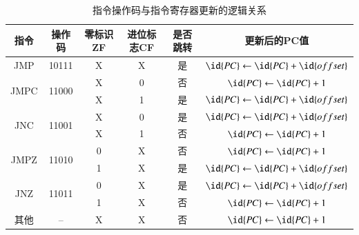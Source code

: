 \documentclass[titlepage, 11pt]{article}
\begin{document}
		\begin{table}[htb]
			\centering
			\caption{指令操作码与指令寄存器更新的逻辑关系}
			\begin{tabular}{c|c|c|c|c|c}
				指令                    & 操作码                    & 零标识ZF & 进位标志CF & 是否跳转 & 更新后的PC值                            \\ \hline
				JMP                   & 10111                  & X     & X      & 是    & $\id{PC}\gets \id{PC}+\id{offset}$ \\ \hline
				\multirow{2}{*}{JMPC} & \multirow{2}{*}{11000} & X     & 0      & 否    & $\id{PC}\gets \id{PC}+1$           \\ \cline{3-6} 
				&                        & X     & 1      & 是    & $\id{PC}\gets \id{PC}+\id{offset}$ \\ \hline
				\multirow{2}{*}{JNC}  & \multirow{2}{*}{11001} & X     & 0      & 是    & $\id{PC}\gets \id{PC}+\id{offset}$ \\ \cline{3-6} 
				&                        & X     & 1      & 否    & $\id{PC}\gets \id{PC}+1$           \\ \hline
				\multirow{2}{*}{JMPZ} & \multirow{2}{*}{11010} & 0     & X      & 否    & $\id{PC}\gets \id{PC}+1$           \\ \cline{3-6} 
				&                        & 1     & X      & 是    & $\id{PC}\gets \id{PC}+\id{offset}$ \\ \hline
				\multirow{2}{*}{JNZ}  & \multirow{2}{*}{11011} & 0     & X      & 是    & $\id{PC}\gets \id{PC}+\id{offset}$ \\ \cline{3-6} 
				&                        & 1     & X      & 否    & $\id{PC}\gets \id{PC}+1$           \\ \hline
				其他                    & --                     & X     & X      & 否    & $\id{PC}\gets \id{PC}+1$          
			\end{tabular}
		\end{table}
\end{document}
